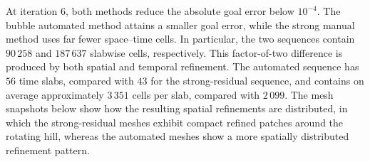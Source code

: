 At iteration $6$, both methods reduce the absolute goal error below \(10^{-4}\). The bubble automated method attains a smaller goal error, while the strong manual method uses far fewer space--time cells. 
In particular, the two sequences contain \(90\,258\) and \(187\,637\) slabwise cells, respectively. This factor-of-two difference is produced by both spatial and temporal refinement. The automated sequence has \(56\) time slabs, compared with \(43\) for the strong-residual sequence, and contains on average approximately \(3\,351\) cells per slab, compared with \(2\,099\). 
The mesh snapshots below show how the resulting spatial refinements are distributed, in which the strong-residual meshes exhibit compact refined patches around the rotating hill, whereas the automated meshes show a more spatially distributed refinement pattern.


